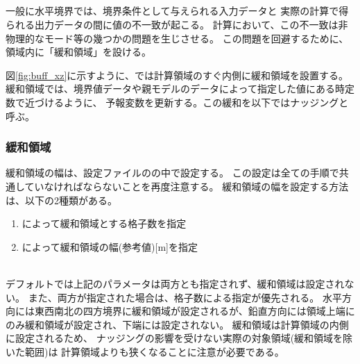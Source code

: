 \subsection{\SubsecBasicBufferSetting} \label{subsec:buffer}

一般に水平境界では、境界条件として与えられる入力データと
実際の計算で得られる出力データの間に値の不一致が起こる。
計算において、この不一致は非物理的なモード等の幾つかの問題を生じさせる。
この問題を回避するために、領域内に「緩和領域」を設ける。

図\ref{fig:buff_xz}に示すように、\scalerm では計算領域のすぐ内側に緩和領域を設置する。
緩和領域では、境界値データや親モデルのデータによって指定した値にある時定数で近づけるように、
予報変数を更新する。この緩和を以下ではナッジングと呼ぶ。

\subsubsection{緩和領域}
緩和領域の幅は、設定ファイルのの中で設定する。
この設定は全ての手順で共通していなければならないことを再度注意する。
緩和領域の幅を設定する方法は、以下の2種類がある。
\begin{enumerate}
\item {} によって緩和領域とする格子数を指定\\
\item {} によって緩和領域の幅(参考値)[m]を指定\\\
\end{enumerate}
デフォルトでは上記のパラメータは両方とも指定されず、緩和領域は設定されない。
また、両方が指定された場合は、格子数による指定が優先される。
水平方向には東西南北の四方境界に緩和領域が設定されるが、鉛直方向には領域上端にのみ緩和領域が設定され、下端には設定されない。
緩和領域は計算領域の内側に設定されるため、
ナッジングの影響を受けない実際の対象領域(緩和領域を除いた範囲)は
計算領域よりも狭くなることに注意が必要である。

